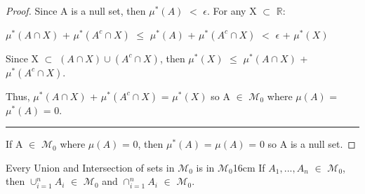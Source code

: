     \begin{proof}
        Since A is a null set, then $\mu^*(A)$ $<$ $\epsilon$.
        For any X $\subset$ $\mathbb{R}$:

        \hspace{0.5cm}
        $\mu^*(A \cap X)$ + $\mu^*(A^c \cap X)$
        $\leq$ $\mu^*(A)$ + $\mu^*(A^c \cap X)$
        $<$ $\epsilon$ + $\mu^*(X)$
        
        Since X $\subset$ $(A \cap X) \cup (A^c \cap X)$, then
        $\mu^*(X)$ $\leq$ $\mu^*(A \cap X)$ + $\mu^*(A^c \cap X)$.

        Thus, $\mu^*(A \cap X)$ + $\mu^*(A^c \cap X)$ = $\mu^*(X)$
        so A $\in$ $\mathcal{M}_0$ where $\mu(A)$ = $\mu^*(A)$ = 0.
        
        \rule[0.1cm]{16.7cm}{0.01cm}

        If A $\in$ $\mathcal{M}_0$ where $\mu(A)$ = 0, then
        $\mu^*(A)$ = $\mu(A)$ = 0 so A is a null set.
    \end{proof}

    \vspace{0.5cm}



    \begin{wtheorem}{Every Union and Intersection of sets in $\mathcal{M}_0$
    is in $\mathcal{M}_0$}{16cm}
        If $A_1,...,A_n$ $\in$ $\mathcal{M}_0$, then
        $\cup_{i=1}^n A_i$ $\in$ $\mathcal{M}_0$
        and $\cap_{i=1}^n A_i$ $\in$ $\mathcal{M}_0$.
    \end{wtheorem}

